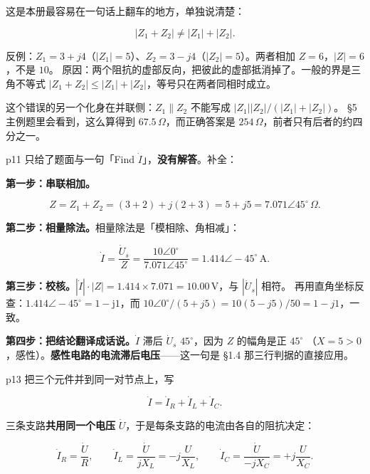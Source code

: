 \documentclass[11pt]{ctexart}
\begin{document}

这是本册最容易在一句话上翻车的地方，单独说清楚：

\[ |Z_1+Z_2|\neq|Z_1|+|Z_2| . \]

反例：$Z_1=3+j4$（$|Z_1|=5$）、$Z_2=3-j4$（$|Z_2|=5$）。两者相加 $Z=6$，$|Z|=6$，不是 $10$。
原因：两个阻抗的虚部反向，把彼此的虚部抵消掉了。一般的界是三角不等式
$|Z_1+Z_2|\le|Z_1|+|Z_2|$，等号只在两者同相时成立。

这个错误的另一个化身在并联侧：$Z_1\parallel Z_2$ 不能写成 $|Z_1||Z_2|/(|Z_1|+|Z_2|)$。
§5 主例题里会看到，这么算得到 $67.5\,\Omega$，而正确答案是 $254\,\Omega$，前者只有后者的约四分之一。


p11 只给了题面与一句「Find $\dot I$」，\textbf{没有解答}。补全：


\textbf{第一步：串联相加。}

\[ Z=Z_1+Z_2=(3+2)+j(2+3)=5+j5=7.071\angle45^\circ\,\Omega . \]

\textbf{第二步：相量除法。}相量除法是「模相除、角相减」：

\[ \dot I=\frac{\dot U_s}{Z}=\frac{10\angle0^\circ}{7.071\angle45^\circ}
   =1.414\angle-45^\circ\,\mathrm{A} . \]

\textbf{第三步：校核。}$|\dot I|\cdot|Z|=1.414\times7.071=10.00\,\mathrm{V}$，与 $|\dot U_s|$ 相符。
再用直角坐标反查：$1.414\angle-45^\circ=1-\mathrm{j}1$，而 $10\angle0^\circ/(5+j5)=10(5-j5)/50=1-j1$，一致。

\textbf{第四步：把结论翻译成话说。}$\dot I$ 滞后 $\dot U_s$  $45^\circ$，因为 $Z$ 的幅角是正 $45^\circ$
（$X=5>0$，感性）。\textbf{感性电路的电流滞后电压}——这一句是 §1.4 那三行判据的直接应用。



p13 把三个元件并到同一对节点上，写

\[ \dot I=\dot I_R+\dot I_L+\dot I_C . \]

三条支路\textbf{共用同一个电压} $\dot U$，于是每条支路的电流由各自的阻抗决定：

\[ \dot I_R=\frac{\dot U}{R} ,\qquad
   \dot I_L=\frac{\dot U}{jX_L}=-j\frac{U}{X_L} ,\qquad
   \dot I_C=\frac{\dot U}{-jX_C}=+j\frac{U}{X_C} . \]
\end{document}
